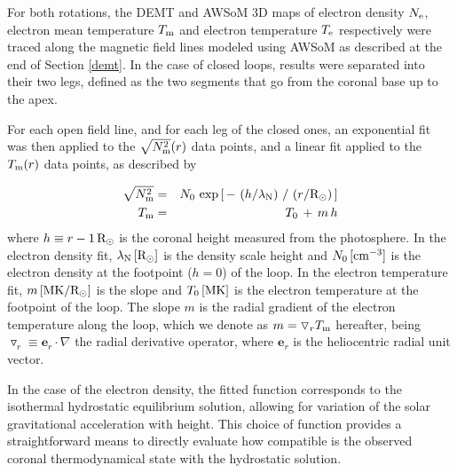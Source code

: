 \documentclass[namedreferences]{solarphysics}
\renewcommand{\l}{\lambda_{\rm N}}%
\newcommand{\mrsun}{{\rm R_\odot}}
\newcommand{\MK}{{\rm MK}}
\newcommand{\cm}{{\rm cm}}
\newcommand{\cminvc}{\cm^{-3}}
\newcommand{\dr}{\triangledown_r}
\newcommand{\er}{\mathbf{e}_r}
\newcommand{\Te}{T_{\rm e}}
\newcommand{\Tm}{T_{\rm m}}
\newcommand{\Ne}{N_{\rm e}}
\newcommand{\Nsqm}{N^2_{{\rm m}}}
\newcommand{\sqravgN}{\sqrt{\Nsqm}}
\begin{document}
\begin{article}
For both rotations, the DEMT and AWSoM 3D maps of electron density $\Ne$, electron mean temperature $\Tm$ and electron temperature $\Te$ respectively were traced along the magnetic field lines modeled using AWSoM as described at the end of Section \ref{demt}. In the case of closed loops, results were separated into their two legs, defined as the two segments that go from the coronal base up to the apex.

For each open field line, and for each leg of the closed ones, an exponential fit was then applied to {the $\sqravgN(r)$ data points, and a linear fit applied to the $\Tm(r)$ data points}, as described by


\begin{eqnarray}\label{Nfit}
\sqravgN &=& N_0\,\exp{\left[\,-\,\left(h/\l\right)\,/\,\left(r/\mrsun\right)\,\right]}\\
\label{Tfit}
\Tm &=& T_0\,+\,m\,h
\end{eqnarray}
\noindent
where $h \equiv r - 1\,\mrsun$ is the coronal height measured from the photosphere. In the electron density fit, $\l\,[\mrsun]$ is the density scale height and $N_0\,[\cminvc]$ is the electron density at the footpoint ($h=0$) of the loop. In the electron temperature fit, $m\,[\MK/\mrsun]$ is the slope and $T_0\,[\MK]$ is the electron temperature at the footpoint of the loop. The slope $m$ is the radial gradient of the electron temperature along the loop, which we denote as $m = \dr\Tm$ hereafter, being $\dr\equiv\er\cdot\nabla$ the radial derivative operator, where $\er$ is the heliocentric radial unit vector.

In the case of the electron density, the fitted function corresponds to the isothermal hydrostatic equilibrium solution, allowing for variation of the solar gravitational acceleration with height. This choice of function provides a straightforward means to directly evaluate how compatible is the observed coronal thermodynamical state with the hydrostatic solution.




\end{article}
\end{document}
